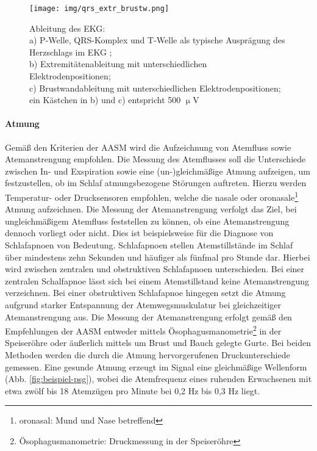\begin{figure}[H]
	\centering
	\texttt{[image: img/qrs\_extr\_brustw.png]}
	\caption[Ableitung des \acs{EKG}]{Ableitung des \acs{EKG}:\\a) P-Welle, QRS-Komplex und T-Welle als typische Ausprägung des Herzschlags im \acs{EKG} \parencite{oresick_kania_ekg_2016};\\b) Extremitätenableitung mit unterschiedlichen Elektrodenpositionen;\\c) Brustwandableitung mit unterschiedlichen Elektrodenpositionen;\\ein Kästchen in b) und c) entspricht 500 $\upmu$V \parencite{bamberger_1x1_2015}}
	\label{fig:qrs_extr_brustw}
\end{figure}

\paragraph{Atmung}
Gemäß den Kriterien der \acs{AASM} wird die Aufzeichnung von Atemfluss sowie Atemanstrengung empfohlen. Die Messung des Atemflusses soll die Unterschiede zwischen In- und Exspiration sowie eine (un-)gleichmäßige Atmung aufzeigen, um festzustellen, ob im Schlaf atmungsbezogene Störungen auftreten. Hierzu werden Temperatur- oder Drucksensoren empfohlen, welche die nasale oder oronasale\footnote{oronasal: Mund und Nase betreffend} Atmung aufzeichnen. Die Messung der Atemanstrengung verfolgt das Ziel, bei ungleichmäßigem Atemfluss feststellen zu können, ob eine Atemanstrengung dennoch vorliegt oder nicht. Dies ist beispielsweise für die Diagnose von Schlafapnoen von Bedeutung. Schlafapnoen stellen Atemstillstände im Schlaf über mindestens zehn Sekunden und häufiger als fünfmal pro Stunde dar. Hierbei wird zwischen zentralen und obstruktiven Schlafapnoen unterschieden. Bei einer zentralen Schalfapnoe lässt sich bei einem Atemstillstand keine Atemanstrengung verzeichnen. Bei einer obstruktiven Schlafapnoe hingegen setzt die Atmung aufgrund starker Entspannung der Atemwegsmuskulatur bei gleichzeitiger Atemanstrengung aus. Die Messung der Atemanstrengung erfolgt gemäß den Empfehlungen der \acs{AASM} entweder mittels Ösophagusmanometrie\footnote{Ösophagusmanometrie: Druckmessung in der Speiseröhre} in der Speiseröhre oder äußerlich mittels um Brust und Bauch gelegte Gurte. Bei beiden Methoden werden die durch die Atmung hervorgerufenen Druckunterschiede gemessen. Eine gesunde Atmung erzeugt im Signal eine gleichmäßige Wellenform (Abb. \ref{fig:beispiel-psg}), wobei die Atemfrequenz eines ruhenden Erwachsenen mit etwa zwölf bis 18 Atemzügen pro Minute bei 0,2 Hz bis 0,3 Hz liegt. \parencite{iber_aasm_2007, lee-chiong_sleep_2008, leroux_handbuch_2009, steffel_lunge_2014}\\

